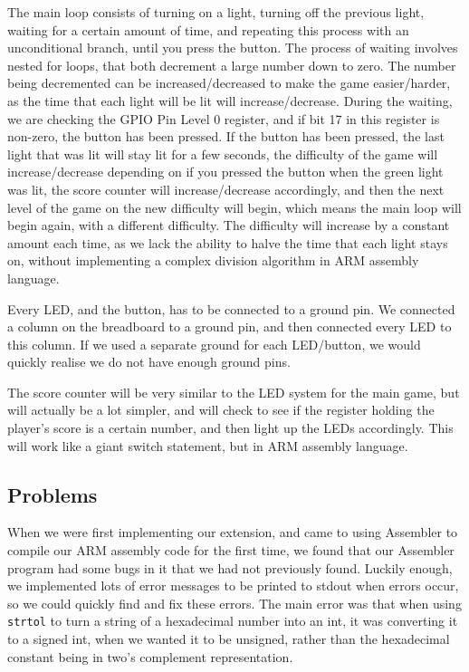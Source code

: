 \documentclass[a4wide, 10pt]{article}
\begin{document}
The main loop consists of turning on a light, turning off the previous light, waiting for a certain amount of time, and repeating this process with an unconditional branch, until you press the button. The process of waiting involves nested for loops, that both decrement a large number down to zero. The number being decremented can be increased/decreased to make the game easier/harder, as the time that each light will be lit will increase/decrease. During the waiting, we are checking the GPIO Pin Level 0 register, and if bit 17 in this register is non-zero, the button has been pressed. If the button has been pressed, the last light that was lit will stay lit for a few seconds, the difficulty of the game will increase/decrease depending on if you pressed the button when the green light was lit, the score counter will increase/decrease accordingly, and then the next level of the game on the new difficulty will begin, which means the main loop will begin again, with a different difficulty. The difficulty will increase by a constant amount each time, as we lack the ability to halve the time that each light stays on, without implementing a complex division algorithm in ARM assembly language.

Every LED, and the button, has to be connected to a ground pin. We connected a column on the breadboard to a ground pin, and then connected every LED to this column. If we used a separate ground for each LED/button, we would quickly realise we do not have enough ground pins.

The score counter will be very similar to the LED system for the main game, but will actually be a lot simpler, and will check to see if the register holding the player's score is a certain number, and then light up the LEDs accordingly. This will work like a giant switch statement, but in ARM assembly language.

\subsection*{Problems}

When we were first implementing our extension, and came to using Assembler to compile our ARM assembly code for the first time, we found that our Assembler program had some bugs in it that we had not previously found. Luckily enough, we implemented lots of error messages to be printed to stdout when errors occur, so we could quickly find and fix these errors. The main error was that when using \texttt{strtol} to turn a string of a hexadecimal number into an int, it was converting it to a signed int, when we wanted it to be unsigned, rather than the hexadecimal constant being in two's complement representation.
\end{document}

